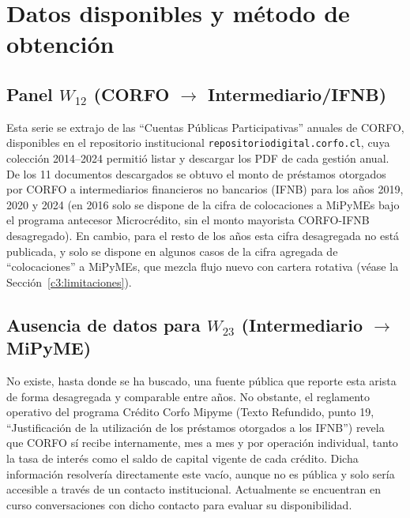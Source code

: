 \section{Datos disponibles y método de obtención}
\label{c3:datos}

\subsection[Panel W12 (CORFO a Intermediario/IFNB)]{Panel $W_{12}$ (CORFO $\to$ Intermediario/IFNB)}
\label{c3:panel-w12}

Esta serie se extrajo de las ``Cuentas Públicas Participativas'' anuales de CORFO, disponibles en el repositorio institucional \texttt{repositoriodigital.corfo.cl}, cuya colección 2014--2024 permitió listar y descargar los PDF de cada gestión anual. De los 11 documentos descargados se obtuvo el monto de préstamos otorgados por CORFO a intermediarios financieros no bancarios (IFNB) para los años 2019, 2020 y 2024 \cite{corfo_cuenta_publica_2019,corfo_cuenta_publica_2020,corfo_cuenta_publica_2024} (en 2016 solo se dispone de la cifra de colocaciones a MiPyMEs bajo el programa antecesor Microcrédito, sin el monto mayorista CORFO-IFNB desagregado). En cambio, para el resto de los años esta cifra desagregada no está publicada, y solo se dispone en algunos casos de la cifra agregada de ``colocaciones'' a MiPyMEs, que mezcla flujo nuevo con cartera rotativa (véase la Sección~\ref{c3:limitaciones}).

\subsection[Ausencia de datos para W23 (Intermediario a MiPyME)]{Ausencia de datos para $W_{23}$ (Intermediario $\to$ MiPyME)}
\label{c3:ausencia-w23}

No existe, hasta donde se ha buscado, una fuente pública que reporte esta arista de forma desagregada y comparable entre años. No obstante, el reglamento operativo del programa Crédito Corfo Mipyme (Texto Refundido, punto 19, ``Justificación de la utilización de los préstamos otorgados a los IFNB'') \cite{corfo_reglamento_credito_mipyme} revela que CORFO sí recibe internamente, mes a mes y por operación individual, tanto la tasa de interés como el saldo de capital vigente de cada crédito. Dicha información resolvería directamente este vacío, aunque no es pública y solo sería accesible a través de un contacto institucional. Actualmente se encuentran en curso conversaciones con dicho contacto para evaluar su disponibilidad.

